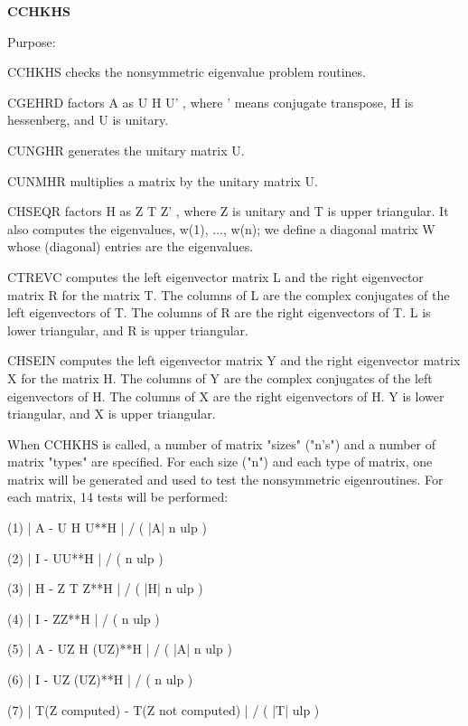 {\bfseries C\+C\+H\+K\+H\+S} 

\begin{DoxyParagraph}{Purpose\+: }
\begin{DoxyVerb}    CCHKHS  checks the nonsymmetric eigenvalue problem routines.

            CGEHRD factors A as  U H U' , where ' means conjugate
            transpose, H is hessenberg, and U is unitary.

            CUNGHR generates the unitary matrix U.

            CUNMHR multiplies a matrix by the unitary matrix U.

            CHSEQR factors H as  Z T Z' , where Z is unitary and T
            is upper triangular.  It also computes the eigenvalues,
            w(1), ..., w(n); we define a diagonal matrix W whose
            (diagonal) entries are the eigenvalues.

            CTREVC computes the left eigenvector matrix L and the
            right eigenvector matrix R for the matrix T.  The
            columns of L are the complex conjugates of the left
            eigenvectors of T.  The columns of R are the right
            eigenvectors of T.  L is lower triangular, and R is
            upper triangular.

            CHSEIN computes the left eigenvector matrix Y and the
            right eigenvector matrix X for the matrix H.  The
            columns of Y are the complex conjugates of the left
            eigenvectors of H.  The columns of X are the right
            eigenvectors of H.  Y is lower triangular, and X is
            upper triangular.

    When CCHKHS is called, a number of matrix "sizes" ("n's") and a
    number of matrix "types" are specified.  For each size ("n")
    and each type of matrix, one matrix will be generated and used
    to test the nonsymmetric eigenroutines.  For each matrix, 14
    tests will be performed:

    (1)     | A - U H U**H | / ( |A| n ulp )

    (2)     | I - UU**H | / ( n ulp )

    (3)     | H - Z T Z**H | / ( |H| n ulp )

    (4)     | I - ZZ**H | / ( n ulp )

    (5)     | A - UZ H (UZ)**H | / ( |A| n ulp )

    (6)     | I - UZ (UZ)**H | / ( n ulp )

    (7)     | T(Z computed) - T(Z not computed) | / ( |T| ulp )


\end{DoxyVerb}
\end{DoxyParagraph}

